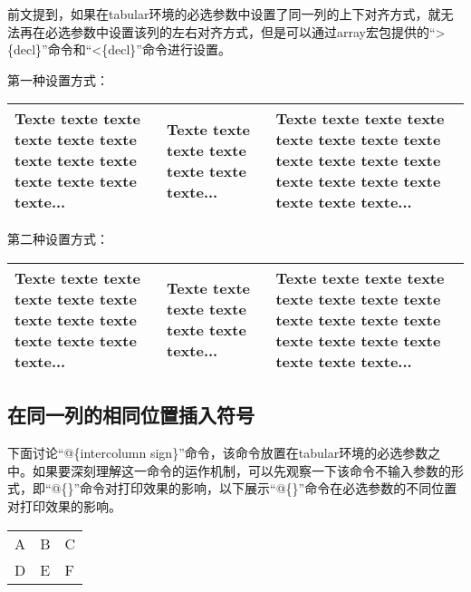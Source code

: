 ﻿\documentclass{article}
\begin{document}
    \mbox{}

    前文提到，如果在tabular环境的必选参数中设置了同一列的上下对齐方式，就无法再在必选参数中设置该列的左右对齐方式，但是可以通过array宏包提供的``>\{decl\}''命令和``<\{decl\}''命令进行设置。

    第一种设置方式：

    \mbox{}

    \begin{tabular}{b{8em}|
        >{\centering}b{8em}|
        >{\raggedleft\arraybackslash}b{8em}|}
        \hline
        Texte texte texte texte texte texte texte
        texte texte texte texte texte texte...&
        Texte texte texte texte texte texte texte...&
        Texte texte texte texte texte texte texte
        texte texte texte texte texte texte
        texte texte texte texte texte texte...\\
        \hline
    \end{tabular}

    \mbox{}

    第二种设置方式：

    \mbox{}

    \begin{tabular}{b{8em}|
        >{\centering}b{8em}|
        >{\raggedleft}b{8em}|}
        \hline
        Texte texte texte texte texte texte texte
        texte texte texte texte texte texte...&
        Texte texte texte texte texte texte texte...&
        Texte texte texte texte texte texte texte
        texte texte texte texte texte texte
        texte texte texte texte texte texte...\tabularnewline
        \hline
    \end{tabular}

\subsection{在同一列的相同位置插入符号}
    下面讨论``@\{intercolumn sign\}''命令，该命令放置在tabular环境的必选参数之中。如果要深刻理解这一命令的运作机制，可以先观察一下该命令不输入参数的形式，即``@\{\}''命令对打印效果的影响，以下展示``@\{\}''命令在必选参数的不同位置对打印效果的影响。

    \mbox{}

    \begin{tabular}{lll}
        \hline
        A&B&C\\
        D&E&F\\
        \hline
    \end{tabular}
\end{document}
